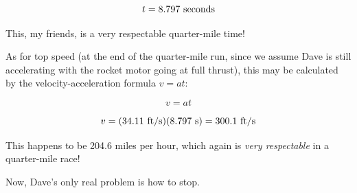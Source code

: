 $$t = 8.797 \hbox{ seconds}$$

This, my friends, is a very respectable quarter-mile time!

\vskip 10pt

\filbreak

As for top speed (at the end of the quarter-mile run, since we assume Dave is still accelerating with the rocket motor going at full thrust), this may be calculated by the velocity-acceleration formula $v = at$:

$$v = at$$

$$v = (34.11 \hbox{ ft/s})(8.797 \hbox{ s}) = 300.1 \hbox{ ft/s}$$

This happens to be 204.6 miles per hour, which again is {\it very respectable} in a quarter-mile race!

\vskip 10pt

Now, Dave's only real problem is how to stop.












